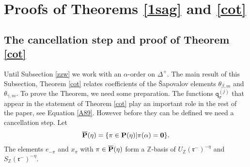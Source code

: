 \documentclass{article}
\def\q{{\mathtt q}}
\def\Z{{\mathbb Z}}
\newcommand{\tth}{\mathtt{hy}}
\newcommand{\noi}{\noindent}
\newcommand{\ga}{\alpha}
\newcommand{\gb}{\beta}
\newcommand{\gs}{\sigma}
\newcommand{\gz}{\zeta}
\newcommand{\fn}{\mathfrak{n}}
\newcommand{\nn}{\nonumber}
\newcommand{\be}{\begin{equation}}
\newcommand{\ee}{\end{equation}}
\begin{document}
\section{Proofs of Theorems   \ref{1sag} and \ref{cot}}\label{1s.5}

\subsection{The cancellation step and proof of Theorem \ref{cot} } \label{cs} Until Subsection \ref{zzw} we work with an $\ga$-order on $ \Delta^+$.  
\noi The main result of this Subsection, Theorem \ref{cot} relates
coefficients  of the Šapovalov elements  $\theta_{\gb,m}$ and $\theta_{\gamma,m}$. 
To prove the Theorem, we need some preparation.  
The functions $ \q^{(j)} _{\gs}$ that appear in  the statement  of Theorem \ref{cot} play an important role in the rest of the paper, see Equation \eqref{A89}. %
However before they can be defined we need a cancellation step. 
Let  $${\overline{\bf P}}(\eta)=\{\pi \in \bf{{P}}(\eta)| \pi(\ga)=0\}.$$
The elements $e_{- \pi}$ and  $x_{\pi} $ with  $\pi \in \bf{\overline{P}}(\eta)$  form a $\Z$-basis of 
$U_\Z(\mathfrak{r}^-)^{-\eta}$ and $S_\Z(\mathfrak{r}^-)^{-\eta}$.
\end{document}
